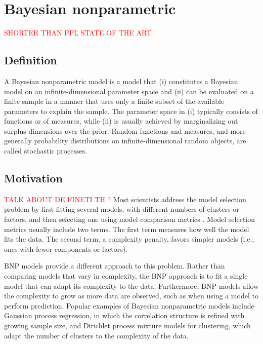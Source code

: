 \chapter{Bayesian nonparametric}
\textcolor{red}{SHORTER THAN PPL STATE OF THE ART}

\section{Definition} \label{BNP_def}
A Bayesian nonparametric model is a model that (i) constitutes a Bayesian model on an infinite-dimensional parameter space and (ii) can be evaluated on a finite sample in a manner that uses only a finite subset of the available parameters to explain the sample.
The parameter space in (i) typically consists of functions or of measures, while (ii) is usually achieved by marginalizing out surplus dimensions over the prior. Random functions and measures, and more generally probability distributions on infinite-dimensional random objects, are called stochastic processes.


\section{Motivation}
\textcolor{red}{TALK ABOUT DE FINETI TH ?}
Most scientists address the model selection problem by first fitting several models, with different numbers of clusters or factors, and then selecting one using model comparison metrics \cite{Claeskens:1251912}. Model selection metrics usually include two terms. The first term measures how well the model fits the data. The second term, a complexity penalty, favors simpler models (i.e., ones with fewer components or factors).

\gls{BNP} models provide a different approach to this problem. Rather than comparing models that vary in complexity, the \gls{BNP} approach is to fit a single model that can adapt its complexity to the data. Furthermore, \gls{BNP} models allow the complexity to grow as more data are observed, such as when using a model to perform prediction.
Popular examples of Bayesian nonparametric models include Gaussian process regression, in which the correlation structure is refined with growing sample size, and Dirichlet process mixture models for clustering, which adapt the number of clusters to the complexity of the data.


